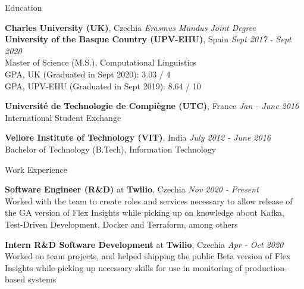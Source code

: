 \documentclass{resume}
\begin{document}



\begin{rSection}{Education}

    {\bf Charles University (UK)}, Czechia \hfill 
        {\em Erasmus Mundus Joint Degree}\\
    {\bf University of the Basque Country (UPV-EHU)}, Spain \hfill 
        {\em Sept 2017 - Sept 2020}\\
            Master of Science (M.S.), Computational Linguistics\\
            GPA, UK (Graduated in Sept 2020): 3.03 / 4\\
            GPA, UPV-EHU (Graduated in Sept 2019): 8.64 / 10
    
    {\bf Universit\'e de Technologie de Compi\`egne (UTC)}, France \hfill
        {\em Jan - June 2016}\\
            International Student Exchange
            
    {\bf Vellore Institute of Technology (VIT)}, India \hfill
        {\em July 2012 - June 2016}\\
            Bachelor of Technology (B.Tech), Information Technology
    
\end{rSection}


\begin{rSection}{Work Experience}

    {\textbf{Software Engineer (R\&D)} at \textbf{Twilio}, Czechia} \hfill {\em Nov 2020 - Present}\\
    Worked with the team to create roles and services necessary to allow release of the GA version of Flex Insights while picking up on knowledge about Kafka, Test-Driven Development, Docker and Terraform, among others
            
    {\textbf{Intern R\&D Software Development} at \textbf{Twilio}, Czechia}
        \hfill {\em Apr - Oct 2020}\\
    Worked on team projects, and helped shipping the public Beta version of Flex Insights while picking up necessary skills for use in monitoring of production-based systems

\end{rSection}
\end{document}
